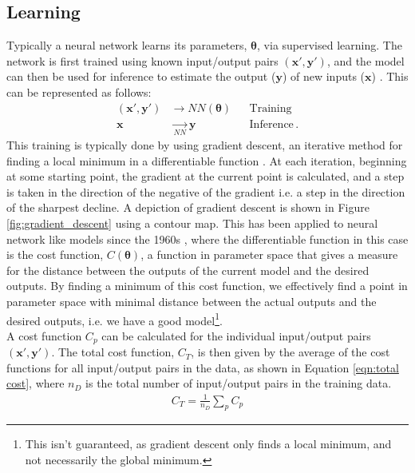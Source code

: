\documentclass[11pt,a4paper,onecolumn]{report}
\begin{document}
\subsection{Learning}
\label{sec:learning}
Typically a neural network learns its parameters, \(\bm{\theta}\), via
supervised learning. The network is first trained using known input/output pairs
\((\bm{x'}, \bm{y'})\), and the model can then be used for inference to estimate
the output (\(\bm{y}\)) of new inputs (\(\bm{x}\)) \citep{reagen2017}. This can
be represented as follows:
\begin{align*}
  (\bm{x'}, \bm{y'}) &\rightarrow NN(\bm{\theta}) && \text{Training} \\
  \bm{x} &\mathrel{\underset{NN}{\rightarrow}} \bm{y} && \text{Inference} \,.
\end{align*}
This training is typically done by using gradient descent, an iterative method
for finding a local minimum in a differentiable function \citep{cauchy_1847}. At
each iteration, beginning at some starting point, the gradient at the current
point is calculated, and a step is taken in the direction of the negative of the
gradient i.e. a step in the direction of the sharpest decline. A depiction of
gradient descent is shown in Figure \ref{fig:gradient_descent} using a contour
map. This has been applied to neural network like models since the 1960s
\citep{bryson1962steepest}, where the differentiable function in this case is
the cost function, \(C(\bm{\theta})\), a function in parameter space that gives
a measure for the distance between the outputs of the current model and the
desired outputs. By finding a minimum of this cost function, we effectively find
a point in parameter space with minimal distance between the actual outputs and
the desired outputs, i.e. we have a good model\footnote{This isn't guaranteed,
as gradient descent only finds a local minimum, and not necessarily the global
minimum.}.\\

A cost function \(C_p\) can be calculated for the individual input/output pairs
\((\bm{x'}, \bm{y'})\). The total cost function, \(C_T\), is then given by the
average of the cost functions for all input/output pairs in the data, as shown
in Equation \ref{eqn:total cost}, where \(n_D\) is the total number of
input/output pairs in the training data.
\begin{align}
  C_T = \frac{1}{n_D} \sum\limits_{p} C_p \label{eqn:total cost}
\end{align}
\end{document}
